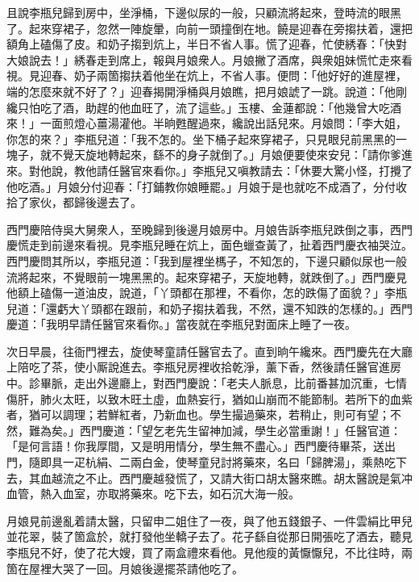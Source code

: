 且說李瓶兒歸到房中，坐淨桶，下邊似尿的一般，只顧流將起來，登時流的眼黑了。起來穿裙子，忽然一陣旋暈，向前一頭撞倒在地。饒是迎春在旁搊扶着，還把額角上磕傷了皮。和奶子搊到炕上，半日不省人事。慌了迎春，忙使綉春：「快對大娘說去！」綉春走到席上，報與月娘衆人。月娘撇了酒席，與衆姐妹慌忙走來看視。見迎春、奶子兩箇搊扶着他坐在炕上，不省人事。便問：「他好好的進屋裡，端的怎麼來就不好了？」迎春揭開淨桶與月娘瞧，把月娘諕了一跳。說道：「他剛纔只怕吃了酒，助趕的他血旺了，流了這些。」玉樓、金蓮都說：「他幾曾大吃酒來！」一面煎燈心薑湯灌他。半晌甦醒過來，纔說出話兒來。月娘問：「李大姐，你怎的來？」李瓶兒道：「我不怎的。坐下桶子起來穿裙子，只見眼兒前黑黑的一塊子，就不覺天旋地轉起來，繇不的身子就倒了。」月娘便要使來安兒：「請你爹進來。對他說，教他請任醫官來看你。」李瓶兒又嗔教請去：「休要大驚小怪，打攪了他吃酒。」{}月娘分付迎春：「打鋪教你娘睡罷。」月娘于是也就吃不成酒了，分付收拾了家伙，都歸後邊去了。

西門慶陪侍吳大舅衆人，至晚歸到後邊月娘房中。月娘告訴李瓶兒跌倒之事，西門慶慌走到前邊來看視。見李瓶兒睡在炕上，面色蠟查黃了，扯着西門慶衣袖哭泣。西門慶問其所以，李瓶兒道：「我到屋裡坐榪子，不知怎的，下邊只顧似尿也一般流將起來，不覺眼前一塊黑黑的。起來穿裙子，天旋地轉，就跌倒了。」西門慶見他額上磕傷一道油皮，說道，「丫頭都在那裡，不看你，怎的跌傷了面貌？」李瓶兒道：「還虧大丫頭都在跟前，和奶子搊扶着我，不然，還不知跌的怎樣的。」西門慶道：「我明早請任醫官來看你。」當夜就在李瓶兒對面床上睡了一夜。

次日早晨，往衙門裡去，旋使琴童請任醫官去了。直到晌午纔來。西門慶先在大廳上陪吃了茶，使小厮說進去。李瓶兒房裡收拾乾淨，薰下香，然後請任醫官進房中。診畢脈，走出外邊廳上，對西門慶說：「老夫人脈息，比前番甚加沉重，{}七情傷肝，肺火太旺，以致木旺土虛，血熱妄行，猶如山崩而不能節制。若所下的血紫者，猶可以調理；若鮮紅者，乃新血也。學生撮過藥來，若稍止，則可有望；不然，難為矣。」{}西門慶道：「望乞老先生留神加減，學生必當重謝！」任醫官道：「是何言語！你我厚間，又是明用情分，學生無不盡心。」西門慶待畢茶，送出門，隨即具一疋杭絹、二兩白金，使琴童兒討將藥來，名曰「歸脾湯」，乘熱吃下去，其血越流之不止。西門慶越發慌了，又請大街口胡太醫來瞧。胡太醫說是氣冲血管，熱入血室，亦取將藥來。吃下去，如石沉大海一般。

月娘見前邊亂着請太醫，只留申二姐住了一夜，與了他五錢銀子、一件雲絹比甲兒並花翠，裝了箇盒於，就打發他坐轎子去了。花子繇自從那日開張吃了酒去，聽見李瓶兒不好，使了花大嫂，買了兩盒禮來看他。見他瘦的黃懨懨兒，不比往時，兩箇在屋裡大哭了一回。{}月娘後邊擺茶請他吃了。

